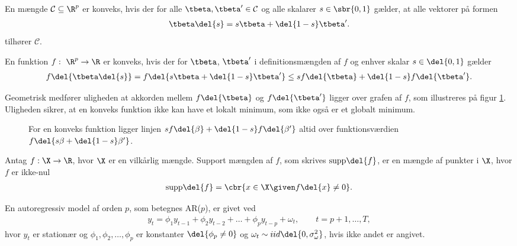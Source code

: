 \begin{defn} \label{defn:konveksm}
En mængde \(\mathcal{C} \subseteq \R^p\) er konveks, hvis der for alle \(\tbeta, \tbeta' \in \mathcal{C}\) og alle skalarer \(s \in \sbr{0,1}\) gælder, at alle vektorer på formen
\begin{align*}
\tbeta \del{s} = s \tbeta + \del{1-s} \tbeta'.
\end{align*}
tilhører \(\mathcal{C}\).
\end{defn}

\begin{defn} \label{defn:konveksfkt}
En funktion \(f: \ \R^p \rightarrow \R\) er konveks, hvis der for \(\tbeta\), \(\tbeta'\) i definitionsmængden af \(f\) og enhver skalar \(s \in \del{0,1}\) gælder
\begin{align*}
f \del{\tbeta \del{s}} = f \del{s \tbeta + \del{1-s} \tbeta'} \leq s f\del{\tbeta} + \del{1-s} f\del{\tbeta'}.
\end{align*}
\end{defn}
Geometrisk medfører uligheden at akkorden mellem \(f \del{\tbeta}\) og  \(f \del{\tbeta'}\) ligger over grafen af \(f\), som illustreres på figur \ref{fig:konveks}.
Uligheden sikrer, at en konveks funktion ikke kan have et lokalt minimum, som ikke også er et globalt minimum.
%
\begin{figure}[H]
\centering
\scalebox{1.2}{}
\caption{For en konveks funktion ligger linjen \(s f \del{\beta} + \del{1-s} f \del{\beta'}\) altid over funktionsværdien \(f \del{s \beta + \del{1-s} \beta'}\).} \label{fig:konveks}
\end{figure}
%
\begin{defn} \label{defn:supp}
Antag \(f: \X \rightarrow \R\), hvor \(\X\) er en vilkårlig mængde.
Support mængden af \(f\), som skrives \(\text{supp} \del{f}\), er en mængde af punkter i \(\X\), hvor \(f\) er ikke-nul
\begin{align*}
\text{supp} \del{f} = \cbr{x \in \X \given f \del{x} \neq 0}.
\end{align*}
\end{defn}
%
\begin{defn} \label{def:ar}
En autoregressiv model af orden $p$, som betegnes AR($p$), er givet ved
\begin{align*}
y_t = \phi_1 y_{t-1} + \phi_2 y_{t-2} + \dots + \phi_p y_{t-p} + \omega_t, \qquad t = p+1, \dots, T,  
\end{align*}
hvor $y_t$ er stationær og $\phi_1 , \phi_2, \dots, \phi_p $ er konstanter  $\del{ \phi_p \neq 0}$ og $\omega_t \sim iid\del{0, \sigma_\omega^2}$, hvis ikke andet er angivet.  
\end{defn}

